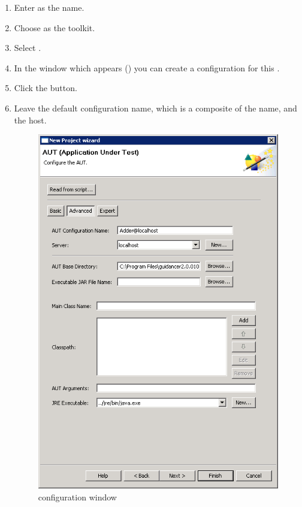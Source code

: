 \begin{enumerate}
\item Enter  as the \gdaut{} name. 
\item Choose  as the toolkit.
\item Select .
\item In the window which appears () you can create a configuration for this \gdaut{}. 
\item Click the  button.
\item Leave the default configuration name, which is a composite of the \gdaut{} name, and the \gdserver{} host. 

\begin{figure}[h]
\begin{center}
\includegraphics[width=12cm]{Tutorials/PS/TutConfigureAUT}
\caption{\gdaut configuration window}
\label{TutConfigureAUT}
\end{center}
\end{figure}


\end{enumerate}
